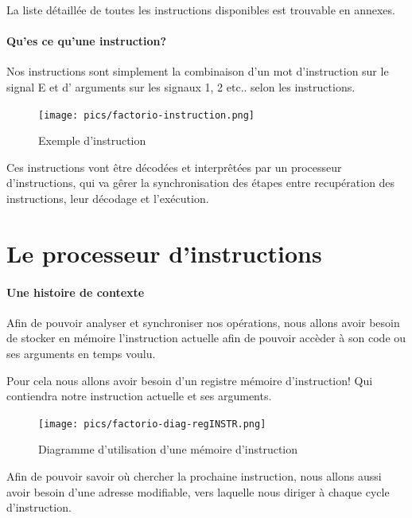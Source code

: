 \documentclass{scrreprt}
\begin{document}
	    	\begin{info}
	    		La liste détaillée de toutes les instructions disponibles est trouvable en annexes.
    		\end{info}
	    	
	    	\paragraph{Qu'es ce qu'une instruction?}
	    	Nos instructions sont simplement la combinaison d'un mot d'instruction sur le signal E et d' arguments sur les signaux 1, 2 etc.. selon les instructions.
	    	
	    	\begin{figure}[h]
	    		\centering
	    		\texttt{[image: pics/factorio-instruction.png]}
	    		
	    		\caption{Exemple d'instruction}
	    	\end{figure}
    	
    		
	    	
	    	Ces instructions vont être décodées et interprêtées par un processeur d'instructions, qui va gêrer la synchronisation des étapes entre recupération des instructions, leur décodage et l'exécution. 
	    	
	    \section{Le processeur d'instructions}
	    
	    	
	    	
	    	\paragraph{Une histoire de contexte}
	    	Afin de pouvoir analyser et synchroniser nos opérations, nous allons avoir besoin de stocker en mémoire l'instruction actuelle afin de pouvoir accèder à son code ou ses arguments en temps voulu.
	    	
	    	Pour cela nous allons avoir besoin d'un registre mémoire d'instruction!
	    	Qui contiendra notre instruction actuelle et ses arguments.
	    	\begin{figure}[h]
	    		\centering
	    		\texttt{[image: pics/factorio-diag-regINSTR.png]}
	    		
	    		\caption{Diagramme d'utilisation d'une mémoire d'instruction}
	    	\end{figure}
	    	
	    	Afin de pouvoir savoir où chercher la prochaine instruction, nous allons aussi avoir besoin d'une adresse modifiable, vers laquelle nous diriger à chaque cycle d'instruction.
	    	
\end{document}
